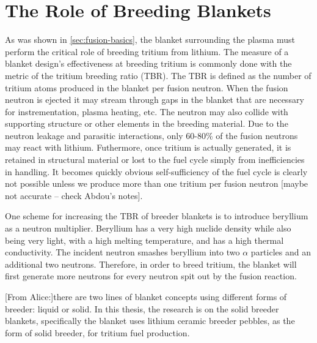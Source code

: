 \section{The Role of Breeding Blankets}
As was shown in \cref{sec:fusion-basics}, the blanket surrounding the plasma must perform the critical role of breeding tritium from lithium. The measure of a blanket design's effectiveness at breeding tritium is commonly done with the metric of the tritium breeding ratio (TBR). The TBR is defined as the number of tritium atoms produced in the blanket per fusion neutron. When the fusion neutron is ejected it may stream through gaps in the blanket that are necessary for instrementation, plasma heating, etc. The neutron may also collide with supporting structure or other elements in the breeding material. Due to the neutron leakage and parasitic interactions, only 60-80\% of the fusion neutrons may react with lithium. Futhermore, once tritium is actually generated, it is retained in structural material or lost to the fuel cycle simply from inefficiencies in handling. It becomes quickly obvious self-sufficiency of the fuel cycle is clearly not possible unless we produce more than one tritium per fusion neutron [maybe not accurate -- check Abdou's notes]. 

One scheme for increasing the TBR of breeder blankets is to introduce beryllium as a neutron multiplier. Beryllium has a very high nuclide density while also being very light, with a high melting temperature, and has a high thermal conductivity. The incident neutron smashes beryllium into two $\alpha$ particles and an additional two neutrons. Therefore, in order to breed tritium, the blanket will first generate more neutrons for every neutron spit out by the fusion reaction.



[From Alice:]there are two lines of blanket concepts using different forms of breeder: liquid or solid. In this thesis, the research is on the solid breeder blankets, specifically the blanket uses lithium ceramic breeder pebbles, as the form of solid breeder, for tritium fuel production. 